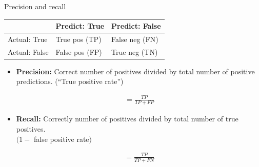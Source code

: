 \documentclass[mathserif, aspectratio=169, xcolor=table]{beamer}
\begin{document}
\begin{frame}{Precision and recall}
\begin{table}[]
\begin{tabular}{l|l|l|}
\cline{2-3}
                                               & \cellcolor[HTML]{EFEFEF} Predict: True & \cellcolor[HTML]{EFEFEF} Predict: False \\ \hline
\multicolumn{1}{|l|}{\cellcolor[HTML]{EFEFEF}Actual: True} &      True pos (TP)                    &                False neg (FN)          \\ \hline
\multicolumn{1}{|l|}{\cellcolor[HTML]{EFEFEF}Actual: False} &           False pos (FP)              &               True neg (TN)           \\ \hline
\end{tabular}
\end{table}


\begin{itemize}
	\item \textbf{Precision:} Correct number of positives divided by total number of positive predictions. 
	(``True positive rate'')

	\begin{align*}
		 = \frac{TP}{TP+FP}
	\end{align*}


	\item \textbf{Recall:} Correctly number of positives divided by total number of true positives. \\
	$(1 -$ false positive rate$)$

	\begin{align*}
		 = \frac{TP}{TP+FN}
	\end{align*}

\end{itemize}

\end{frame}
\end{document}
